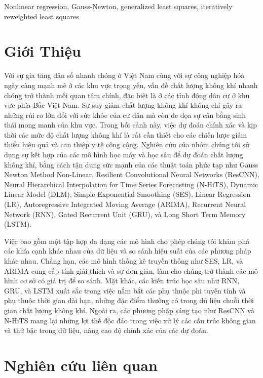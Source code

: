 \documentclass[conference]{IEEEtran}
\begin{document}
\begin{IEEEkeywords}
    Nonlinear regression, Gauss-Newton, generalized least squares, iteratively reweighted least
    squares
\end{IEEEkeywords}

\section{Giới Thiệu}
Với sự gia tăng dân số nhanh chóng ở Việt Nam cùng với sự công nghiệp hóa ngày càng mạnh mẽ ở các khu vực trọng yếu, vấn đề chất lượng không khí nhanh chóng trở thành mối quan tâm chính, đặc biệt là ở các tỉnh đông dân cư ở khu vực phía Bắc Việt Nam. Sự suy giảm chất lượng không khí không chỉ gây ra những rủi ro lớn đối với sức khỏe của cư dân mà còn đe dọa sự cân bằng sinh thái mong manh của khu vực. Trong bối cảnh này, việc dự đoán chính xác và kịp thời các mức độ chất lượng không khí là rất cần thiết cho các chiến lược giảm thiểu hiệu quả và can thiệp y tế công cộng. Nghiên cứu của nhóm chúng tôi sử dụng sự kết hợp của các mô hình học máy và học sâu để dự đoán chất lượng không khí, bằng cách tận dụng sức mạnh của các thuật toán phức tạp như Gauss Newton Method Non-Linear, Resilient Convolutional Neural Networks (ResCNN), Neural Hierarchical Interpolation for Time Series Forecasting (N-HiTS), Dynamic Linear Model (DLM), Simple Exponential Smoothing (SES), Linear Regression (LR), Autoregressive Integrated Moving Average (ARIMA), Recurrent Neural Network (RNN), Gated Recurrent Unit (GRU), và Long Short Term Memory (LSTM).

Việc bao gồm một tập hợp đa dạng các mô hình cho phép chúng tôi khám phá các khía cạnh khác nhau của dữ liệu và so sánh hiệu suất của các phương pháp khác nhau. Chẳng hạn, các mô hình thống kê truyền thống như SES, LR, và ARIMA cung cấp tính giải thích và sự đơn giản, làm cho chúng trở thành các mô hình cơ sở có giá trị để so sánh. Mặt khác, các kiến trúc học sâu như RNN, GRU, và LSTM xuất sắc trong việc nắm bắt các phụ thuộc phi tuyến tính và phụ thuộc thời gian dài hạn, những đặc điểm thường có trong dữ liệu chuỗi thời gian chất lượng không khí. Ngoài ra, các phương pháp sáng tạo như ResCNN và N-HiTS mang lại những lợi thế độc đáo trong việc xử lý các cấu trúc không gian và thứ bậc trong dữ liệu, nâng cao độ chính xác của các dự đoán.

\section{Nghiên cứu liên quan}
\end{document}
